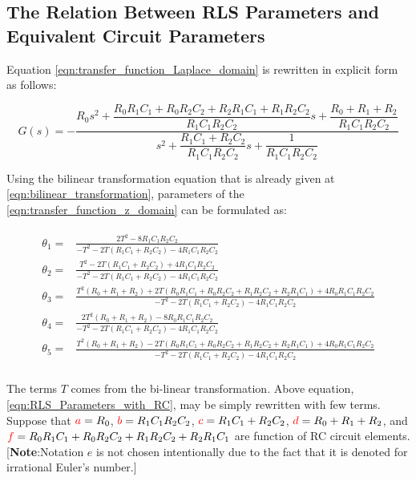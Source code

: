 \documentclass[12pt]{article}
\begin{document}
\begin{appendices}
\section{The Relation Between RLS Parameters and Equivalent Circuit Parameters} \label{Relation_RLS_Parameter_Circuit_Parameter} 
Equation \ref{eqn:transfer_function_Laplace_domain} is rewritten in explicit form as follows: %

\begin{equation}
	\label{eqn:transfer_function_Laplace_domain_2}
	G(s) = -\dfrac{R_{0}s^{2} + \dfrac{R_{0}R_{1}C_{1}+R_{0}R_{2}C_{2}+R_{2}R_{1}C_{1}+R_{1}R_{2}C_{2}}{R_{1}C_{1}R_{2}C_{2}}s+\dfrac{R_{0}+R_{1}+R_{2}}{R_{1}C_{1}R_{2}C_{2}}}{s^2 + \dfrac{R_{1}C_{1}+R_{2}C_{2}}{R_{1}C_{1}R_{2}C_{2}}s + \dfrac{1}{R_{1}C_{1}R_{2}C_{2}}}
\end{equation}

\noindent Using the bilinear transformation equation that is already given at \ref{eqn:bilinear_transformation}, parameters of the \ref{eqn:transfer_function_z_domain} can be formulated as:

\begin{align}
	\label{eqn:RLS_Parameters_with_RC}
	\begin{split}
		\theta_{1} =& \frac{2T^{2} - 8R_{1}C_{1}R_{2}C_{2}}{-T^{2}-2T(R_{1}C_{1}+R_{2}C_{2})-4R_{1}C_{1}R_{2}C_{2}}\\
		\theta_{2} =& \frac{T^{2}-2T(R_{1}C_{1}+R_{2}C_{2})+4R_{1}C_{1}R_{2}C_{2}}{-T^{2}-2T(R_{1}C_{1}+R_{2}C_{2})-4R_{1}C_{1}R_{2}C_{2}} \\
		\theta_{3} =& \frac{T^{2}(R_{0}+R_{1}+R_{2})+2T(R_{0}R_{1}C_{1}+R_{0}R_{2}C_{2}+R_{1}R_{2}C_{2}+R_{2}R_{1}C_{1}) + 4R_{0}R_{1}C_{1}R_{2}C_{2}}{-T^{2}-2T(R_{1}C_{1}+R_{2}C_{2})-4R_{1}C_{1}R_{2}C_{2}}\\
		\theta_{4} =& \frac{2T^{2}(R_{0}+R_{1}+R_{2})-8R_{0}R_{1}C_{1}R_{2}C_{2}}{-T^{2}-2T(R_{1}C_{1}+R_{2}C_{2})-4R_{1}C_{1}R_{2}C_{2}} \\
		\theta_{5} =& \frac{T^{2}(R_{0}+R_{1}+R_{2})-2T(R_{0}R_{1}C_{1}+R_{0}R_{2}C_{2}+R_{1}R_{2}C_{2}+R_{2}R_{1}C_{1})+4R_{0}R_{1}C_{1}R_{2}C_{2}}{-T^{2}-2T(R_{1}C_{1}+R_{2}C_{2})-4R_{1}C_{1}R_{2}C_{2}} \\ 
	\end{split}
\end{align}

\noindent The terms $T$  comes from the bi-linear transformation. Above equation, \ref{eqn:RLS_Parameters_with_RC}, may be simply rewritten with few terms. Suppose that $\textcolor{red}{a} = R_{0}$, $\textcolor{red}{b} = R_{1}C_{1}R_{2}{C}_{2}$, $\textcolor{red}{c} = R_{1}C_{1}+R_{2}C_{2}$, $\textcolor{red}{d}=R_{0}+R_{1}+R_{2}$, and $\textcolor{red}{f}=R_{0}R_{1}C_{1}+R_{0}R_{2}C_{2}+R_{1}R_{2}C_{2}+R_{2}R_{1}C_{1}$ are function of RC circuit elements. [\textbf{Note}:Notation $e$ is not chosen intentionally due to the fact that it is denoted for irrational Euler's number.]  \cite{Xiangdong2019} 


\end{appendices}
\end{document}
